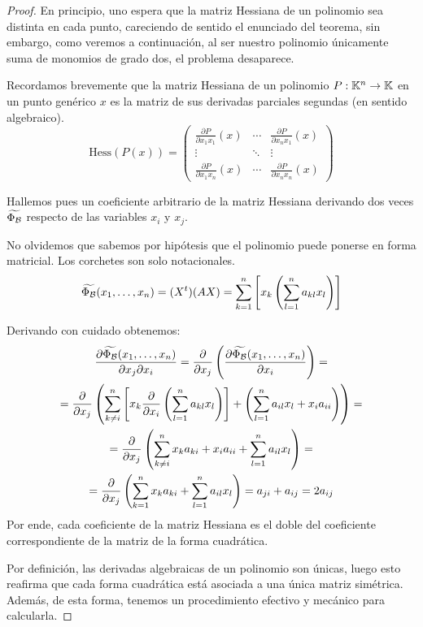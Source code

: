\begin{proof}
	En principio, uno espera que la matriz Hessiana de un polinomio sea distinta en cada punto, careciendo de sentido el enunciado del teorema, sin embargo, como veremos a continuación, al ser nuestro polinomio únicamente suma de monomios de grado dos, el problema desaparece.
	
	Recordamos brevemente que la matriz Hessiana de un polinomio $P:\mathbb{K}^n\to\mathbb{K}$ en un punto genérico $x$ es la matriz de sus derivadas parciales segundas (en sentido algebraico).
	\[\mathrm{Hess}(P(x))=\begin{pmatrix}
	\frac{\partial P}{\partial x_1x_1}(x) & \cdots &\frac{\partial P}{\partial x_nx_1}(x)\\
	\vdots & \ddots & \vdots\\
	\frac{\partial P}{\partial x_1x_n}(x) & \cdots & \frac{\partial P}{\partial x_nx_n}(x)
	\end{pmatrix}\]
	
	Hallemos pues un coeficiente arbitrario de la matriz Hessiana derivando dos veces $\widetilde{\Phi_{\mathcal{B}}}$ respecto de las variables $x_i$ y $x_j$.
	
	No olvidemos que sabemos por hipótesis que el polinomio puede ponerse en forma matricial. Los corchetes son solo notacionales.
	\[\widetilde{\Phi_{\mathcal{B}}}(x_1,\dots,x_n)=(X^t)(AX)=\sum_{k=1}^{n}\left[x_k\left(\sum_{l=1}^{n}a_{kl}x_l\right)\right]\]
	
	Derivando con cuidado obtenemos:
	\begin{multline}
		\frac{\partial \widetilde{\Phi_{\mathcal{B}}}(x_1,\dots,x_n)}{\partial x_j\partial x_i}=\frac{\partial}{\partial x_j}\left(\frac{\partial \widetilde{\Phi_{\mathcal{B}}}(x_1,\dots,x_n)}{\partial x_i}\right)=\\=\frac{\partial}{\partial x_j}\left(\sum_{k\not= i}^{n}\left[x_k\frac{\partial}{\partial x_i}\left(\sum_{l=1}^{n}a_{kl}x_l\right)\right]+\left(\sum_{l=1}^{n}a_{il}x_l+x_ia_{ii}\right)\right)=\\
		=\frac{\partial}{\partial x_j}\left(\sum_{k\not=i}^{n}x_ka_{ki}+x_ia_{ii}+\sum_{l=1}^{n}a_{il}x_l\right)=\\=\frac{\partial}{\partial x_j}\left(\sum_{k=1}^{n}x_ka_{ki}+\sum_{l=1}^{n}a_{il}x_l\right)=a_{ji}+a_{ij}=2a_{ij}
	\end{multline}
	Por ende, cada coeficiente de la matriz Hessiana es el doble del coeficiente correspondiente de la matriz de la forma cuadrática.
	
	Por definición, las derivadas algebraicas de un polinomio son únicas, luego esto reafirma que cada forma cuadrática está asociada a una única matriz simétrica. Además, de esta forma, tenemos un procedimiento efectivo y mecánico para calcularla.
\end{proof}
